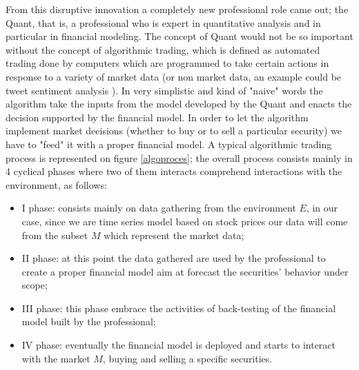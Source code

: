 \documentclass[twocolumn]{article}
\begin{document}
From this disruptive innovation a completely new professional role came out; the Quant, that is, a professional who is expert in quantitative analysis and in particular in financial modeling. The concept of Quant would not be so important without the concept of algorithmic trading, which is defined as automated trading done by computers which are programmed to take certain actions in response to a variety of market data (or non market data, an example could be tweet sentiment analysis \cite{sul2014trading}). In very simplistic and kind of "naive" words the algorithm take the inputs from the model developed by the Quant and enacts the decision supported by the financial model.
In order to let the algorithm implement market decisions (whether to buy or to sell a particular security) we have to "feed" it with a proper financial model. A typical algorithmic trading process is represented on figure \ref{algoproces}; the overall process consists mainly in 4 cyclical phases where two of them interacts comprehend interactions with the environment, as follows:

\begin{itemize}
\item I phase: consists mainly on data gathering from the environment $E$, in our case, since we are time series model based on stock prices our data will come from the subset $M$ which represent the market data;
\item II phase: at this point the data gathered are used by the professional to create a proper financial model aim at forecast the securities' behavior under scope; 
\item III phase: this phase embrace the activities of back-testing of the financial model built by the professional;
\item IV phase: eventually the financial model is deployed and starts to interact with the market $M$, buying and selling a specific securities.
\end{itemize}
\end{document}
